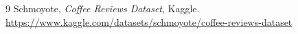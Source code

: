 




\tableofcontents
\clearpage







\begin{thebibliography}{9}
Schmoyote, \emph{Coffee Reviews Dataset}, Kaggle.
\url{https://www.kaggle.com/datasets/schmoyote/coffee-reviews-dataset}
\end{thebibliography}


